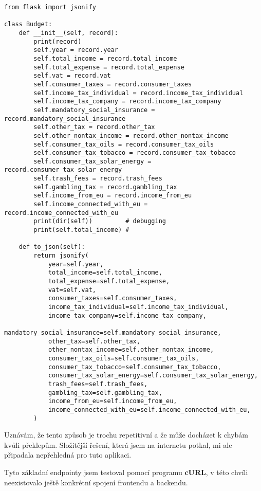 \documentclass[11pt,a4paper,twoside,openright]{report}
\begin{document}
\begin{verbatim}
from flask import jsonify

class Budget:
    def __init__(self, record):
        print(record)
        self.year = record.year
        self.total_income = record.total_income
        self.total_expense = record.total_expense
        self.vat = record.vat
        self.consumer_taxes = record.consumer_taxes
        self.income_tax_individual = record.income_tax_individual
        self.income_tax_company = record.income_tax_company
        self.mandatory_social_insurance = record.mandatory_social_insurance
        self.other_tax = record.other_tax
        self.other_nontax_income = record.other_nontax_income
        self.consumer_tax_oils = record.consumer_tax_oils
        self.consumer_tax_tobacco = record.consumer_tax_tobacco
        self.consumer_tax_solar_energy = record.consumer_tax_solar_energy
        self.trash_fees = record.trash_fees
        self.gambling_tax = record.gambling_tax
        self.income_from_eu = record.income_from_eu
        self.income_connected_with_eu = record.income_connected_with_eu
        print(dir(self))         # debugging
        print(self.total_income) #

    def to_json(self):
        return jsonify(
            year=self.year,
            total_income=self.total_income,
            total_expense=self.total_expense,
            vat=self.vat,
            consumer_taxes=self.consumer_taxes,
            income_tax_individual=self.income_tax_individual,
            income_tax_company=self.income_tax_company,
            mandatory_social_insurance=self.mandatory_social_insurance,
            other_tax=self.other_tax,
            other_nontax_income=self.other_nontax_income,
            consumer_tax_oils=self.consumer_tax_oils,
            consumer_tax_tobacco=self.consumer_tax_tobacco,
            consumer_tax_solar_energy=self.consumer_tax_solar_energy,
            trash_fees=self.trash_fees,
            gambling_tax=self.gambling_tax,
            income_from_eu=self.income_from_eu,
            income_connected_with_eu=self.income_connected_with_eu,
        )
\end{verbatim}

Uznávám, že tento způsob je trochu repetitivní a že může docházet k chybám kvůli překlepům. Složitější řešení,
která jsem na internetu potkal, mi ale připadala nepřehledná pro tuto aplikaci.

Tyto základní endpointy jsem testoval pomocí programu \textbf{cURL}, v této chvíli neexistovalo ještě konkrétní
spojení frontendu a backendu.
\end{document}
